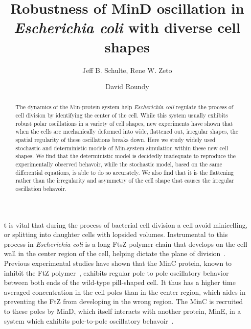 \documentclass{pnastwo}
\begin{document}
\title{Robustness of MinD oscillation in \textbf{\emph{Escherichia coli}} with
  diverse cell shapes}

\author{Jeff B. Schulte,
Rene W. Zeto
\and
David Roundy}


\maketitle

\begin{article}
\begin{abstract}
  The dynamics of the Min-protein system help \emph{Escherichia coli}
  regulate the process of cell division by identifying the center of
  the cell.  While this system usually exhibits robust polar
  oscillations in a variety of cell shapes, new experiments have shown
  that when the cells are mechanically deformed into wide, flattened
  out, irregular shapes, the spatial regularity of these oscillations
  breaks down. Here we study widely used stochastic and deterministic
  models of Min-system simulation within these new cell shapes.  We
  find that the deterministic model is decidedly inadequate to
  reproduce the experimentally observed behavoir, while the stochastic
  model, based on the same differential equations, is able to do so
  accurately.  We also find that it is the flattening rather than the
  irregularity and asymmetry of the cell shape that causes the
  irregular oscillation behavoir.
\end{abstract}




t is vital that during the process of bacterial cell division a cell
avoid minicelling, or splitting into daughter cells with lopsided
volumes.  Instrumental to this process in \emph{Escherichia coli} is a
long FtsZ polymer chain that develops on the cell wall in the center
region of the cell, helping dictate the plane of
division~\cite{adams2009bacterial, lutkenhaus2007assembly}. Previous
experimental studies have shown that the MinC protein, known to
inhibit the FtZ polymer~\cite{shen2010examination}, exhibits regular
pole to pole oscillatory behavior between both ends of the wild-type
pill-shaped cell.  It thus has a higher time averaged concentration in
the cell poles than in the center region, which aides in preventing
the FtZ from developing in the wrong region.  The MinC is recruited to
these poles by MinD, which itself interacts with another protein,
MinE, in a system which exhibits pole-to-pole oscillatory
behavoir~\cite{hu1999topological, fu2001mine, shapiro2009and,
  yu1999ftsz, raskin1999rapid, meacci2005min, raskin1999minde}.


\end{article}
\end{document}
